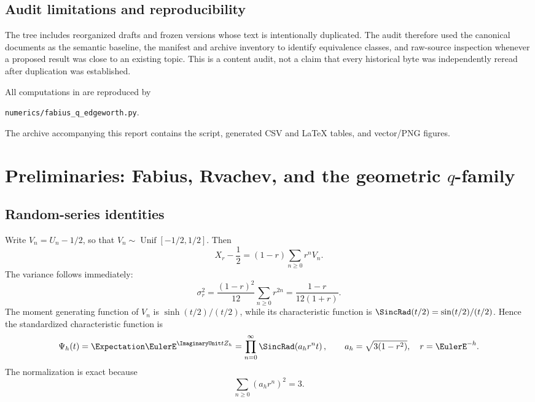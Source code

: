 \documentclass[11pt]{article}
\numberwithin{equation}{section}
\theoremstyle{definition}
\begin{document}
\subsection{Audit limitations and reproducibility}
The tree includes reorganized drafts and frozen versions whose text is intentionally duplicated.  The audit therefore used the canonical documents as the semantic baseline, the manifest and archive inventory to identify equivalence classes, and raw-source inspection whenever a proposed result was close to an existing topic.  This is a content audit, not a claim that every historical byte was independently reread after duplication was established.

All computations in  are reproduced by
\begin{center}
\texttt{numerics/fabius\_q\_edgeworth.py}.
\end{center}
The archive accompanying this report contains the script, generated CSV and LaTeX tables, and vector/PNG figures.

\section{Preliminaries: Fabius, Rvachev, and the geometric \texorpdfstring{$q$}{q}-family}\label{sec:prelim}

\subsection{Random-series identities}
Write \(V_n=U_n-1/2\), so that \(V_n\sim\operatorname{Unif}[-1/2,1/2]\).  Then
\begin{equation}\label{eq:centered-X}
 X_r-\frac12=(1-r)\sum_{n\ge0}r^nV_n.
\end{equation}
The variance follows immediately:
\begin{equation}\label{eq:variance}
 \sigma_r^2=\frac{(1-r)^2}{12}\sum_{n\ge0}r^{2n}
 =\frac{1-r}{12(1+r)}.
\end{equation}
The moment generating function of \(V_n\) is \(\sinh(t/2)/(t/2)\), while its characteristic function is \(\SincRad(t/2)=\sin(t/2)/(t/2)\).  Hence the standardized characteristic function is
\begin{equation}\label{eq:Psi-product}
 \Psi_h(t)=\Expectation\EulerE^{\ImaginaryUnit tZ_h}
 =\prod_{n=0}^{\infty}\SincRad\!\left(a_hr^nt\right),
 \qquad
 a_h=\sqrt{3(1-r^2)},\quad r=\EulerE^{-h}.
\end{equation}
The normalization is exact because
\begin{equation}\label{eq:quadratic-sum}
 \sum_{n\ge0}(a_hr^n)^2=3.
\end{equation}
\end{document}
